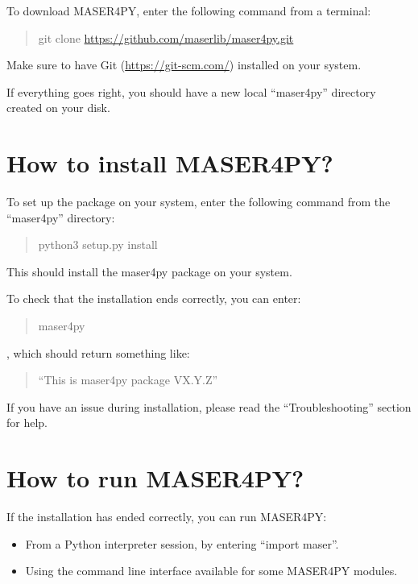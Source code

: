 \documentclass[letterpaper,10pt,english]{sphinxmanual}
\begin{document}
To download MASER4PY, enter the following command from a terminal:
\begin{quote}

git clone \href{https://github.com/maserlib/maser4py.git}{https://github.com/maserlib/maser4py.git}
\end{quote}

Make sure to have Git (\href{https://git-scm.com/}{https://git-scm.com/}) installed on your system.

If everything goes right, you should have a new local ``maser4py'' directory created on your disk.


\section{How to install MASER4PY?}
\label{intro:how-to-install-maser4py}
To set up the package on your system, enter the following
command from the ``maser4py'' directory:
\begin{quote}

python3 setup.py install
\end{quote}

This should install the maser4py package on your
system.

To check that the installation ends correctly, you can enter:
\begin{quote}

maser4py
\end{quote}

, which should return something like:
\begin{quote}

``This is maser4py package VX.Y.Z''
\end{quote}

If you have an issue during installation, please read the ``Troubleshooting'' section for help.


\section{How to run MASER4PY?}
\label{intro:how-to-run-maser4py}
If the installation has ended correctly, you can run MASER4PY:
\begin{itemize}
\item {} 
From a Python interpreter session, by entering ``import maser''.

\item {} 
Using the command line interface available for some MASER4PY modules.

\end{itemize}
\end{document}
